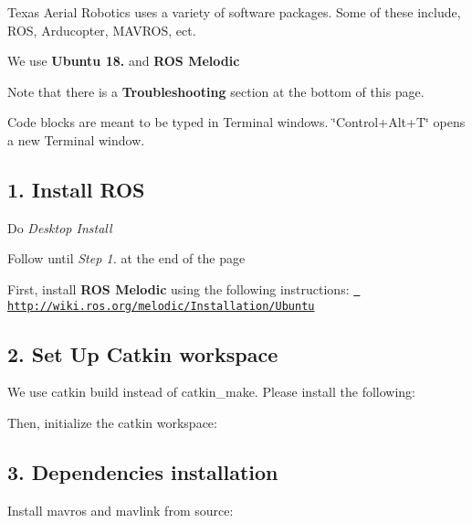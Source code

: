 Texas Aerial Robotics uses a variety of software packages. Some of these include, R\+OS, Arducopter, M\+A\+V\+R\+OS, ect.

We use {\bfseries{Ubuntu 18.}} and {\bfseries{R\+OS Melodic}}

Note that there is a {\bfseries{Troubleshooting}} section at the bottom of this page.

Code blocks are meant to be typed in Terminal windows. \char`\"{}\+Control+\+Alt+\+T\char`\"{} opens a new Terminal window.

\subsection*{1. Install R\+OS}


\begin{DoxyItemize}
\item Do {\itshape Desktop Install}
\item Follow until {\itshape Step 1.} at the end of the page
\end{DoxyItemize}

First, install {\bfseries{R\+OS Melodic}} using the following instructions\+: \href{http://wiki.ros.org/melodic/Installation/Ubuntu}{\texttt{ http\+://wiki.\+ros.\+org/melodic/\+Installation/\+Ubuntu}}

\subsection*{2. Set Up Catkin workspace}

We use {\ttfamily catkin build} instead of {\ttfamily catkin\+\_\+make}. Please install the following\+: 
\begin{DoxyCode}{0}
\end{DoxyCode}


Then, initialize the catkin workspace\+: 
\begin{DoxyCode}{0}
\end{DoxyCode}


\subsection*{3. Dependencies installation}

Install {\ttfamily mavros} and {\ttfamily mavlink} from source\+: 
\begin{DoxyCode}{0}
\DoxyCodeLine{}
\DoxyCodeLine{}
\end{DoxyCode}


